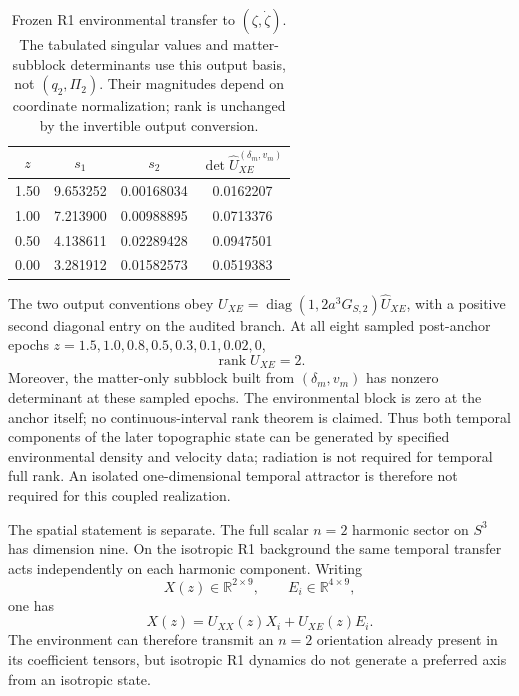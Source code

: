 \begin{table}[htbp]
\centering
\caption{Frozen R1 environmental transfer to $(\zeta,\dot\zeta)$.
The tabulated singular values and matter-subblock determinants use this
output basis, not $(q_2,\Pi_2)$. Their magnitudes depend on coordinate
normalization; rank is unchanged by the invertible output conversion.}
\label{tab:coupled-environment-rank}
\begin{tabular}{cccc}
\toprule
$z$ & $s_1$ & $s_2$ &
$\det\widehat U_{XE}^{(\delta_m,v_m)}$\\
\midrule
1.50 & 9.653252 & 0.00168034 & 0.0162207\\
1.00 & 7.213900 & 0.00988895 & 0.0713376\\
0.50 & 4.138611 & 0.02289428 & 0.0947501\\
0.00 & 3.281912 & 0.01582573 & 0.0519383\\
\bottomrule
\end{tabular}
\end{table}

The two output conventions obey
$U_{XE}=\operatorname{diag}(1,2a^3G_{S,2})\widehat U_{XE}$,
with a positive second diagonal entry on the audited branch.
At all eight sampled post-anchor epochs
$z=1.5,1.0,0.8,0.5,0.3,0.1,0.02,0$,
\begin{equation}
\boxed{\operatorname{rank}U_{XE}=2.}
\end{equation}
Moreover, the matter-only subblock built from $(\delta_m,v_m)$ has nonzero
determinant at these sampled epochs. The environmental block is zero at the
anchor itself; no continuous-interval rank theorem is claimed.  Thus both temporal components of
the later topographic state can be generated by specified environmental
density and velocity data; radiation is not required for temporal full rank.
An isolated one-dimensional temporal attractor is therefore not required
for this coupled realization.

The spatial statement is separate.  The full scalar $n=2$ harmonic sector on
$S^3$ has dimension nine.  On the isotropic R1 background the same temporal
transfer acts independently on each harmonic component.  Writing
\begin{equation}
X(z)\in\mathbb R^{2\times9},
\qquad
E_i\in\mathbb R^{4\times9},
\end{equation}
one has
\begin{equation}
\boxed{
X(z)=U_{XX}(z)X_i+U_{XE}(z)E_i .
}
\end{equation}
The environment can therefore transmit an $n=2$ orientation already present
in its coefficient tensors, but isotropic R1 dynamics do not generate a
preferred axis from an isotropic state.

